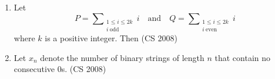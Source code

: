 \begin{enumerate}[label=\thesubsection.\arabic*,ref=\thesubsection.\theenumi]
\hfill (CS 2008)
\begin{enumerate}
\end{enumerate}
\item Let \[ P = \sum\nolimits_{\substack{1 \le i \le 2k \\ i\ \text{odd}}} i \quad\text{and}\quad Q = \sum\nolimits_{\substack{1 \le i \le 2k \\ i\ \text{even}}} i \]where \(k\) is a positive integer. Then 
\hfill (CS 2008)
\begin{enumerate}
\end{enumerate}
\item Let $x_n$ denote the number of binary strings of length $n$ that contain no consecutive $0$s.
\hfill (CS 2008)


\end{enumerate}
